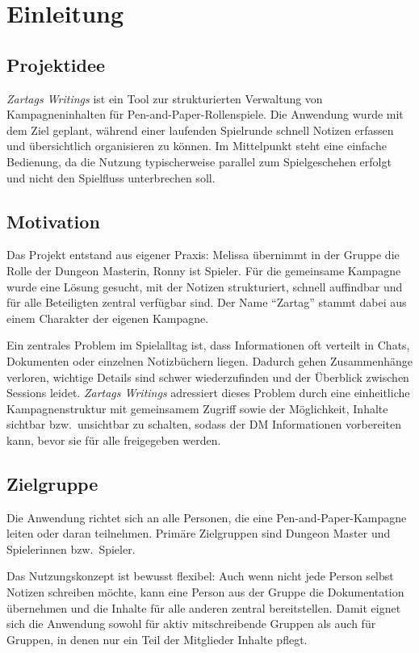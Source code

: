 \section{Einleitung}

\subsection{Projektidee}
\emph{Zartags Writings} ist ein Tool zur strukturierten Verwaltung von
Kampagneninhalten für Pen-and-Paper-Rollenspiele.
Die Anwendung wurde mit dem Ziel geplant, während einer laufenden
Spielrunde schnell Notizen erfassen und übersichtlich organisieren zu können.
Im Mittelpunkt steht eine einfache Bedienung, da die Nutzung typischerweise
parallel zum Spielgeschehen erfolgt und nicht den Spielfluss unterbrechen soll.

\subsection{Motivation}
Das Projekt entstand aus eigener Praxis:
Melissa übernimmt in der Gruppe die Rolle der Dungeon Masterin, Ronny ist
Spieler.
Für die gemeinsame Kampagne wurde eine Lösung gesucht, mit der Notizen
strukturiert, schnell auffindbar und für alle Beteiligten zentral verfügbar sind.
Der Name \enquote{Zartag} stammt dabei aus einem Charakter der eigenen Kampagne.

Ein zentrales Problem im Spielalltag ist, dass Informationen oft verteilt in
Chats, Dokumenten oder einzelnen Notizbüchern liegen.
Dadurch gehen Zusammenhänge verloren, wichtige Details sind schwer wiederzufinden
und der Überblick zwischen Sessions leidet.
\emph{Zartags Writings} adressiert dieses Problem durch eine einheitliche
Kampagnenstruktur mit gemeinsamem Zugriff sowie der Möglichkeit,
Inhalte sichtbar bzw.\ unsichtbar zu schalten, sodass der DM Informationen
vorbereiten kann, bevor sie für alle freigegeben werden.

\subsection{Zielgruppe}
Die Anwendung richtet sich an alle Personen, die eine Pen-and-Paper-Kampagne
leiten oder daran teilnehmen.
Primäre Zielgruppen sind Dungeon Master und Spielerinnen bzw.\ Spieler.

Das Nutzungskonzept ist bewusst flexibel:
Auch wenn nicht jede Person selbst Notizen schreiben möchte, kann eine Person
aus der Gruppe die Dokumentation übernehmen und die Inhalte für alle anderen
zentral bereitstellen.
Damit eignet sich die Anwendung sowohl für aktiv mitschreibende Gruppen als
auch für Gruppen, in denen nur ein Teil der Mitglieder Inhalte pflegt.
